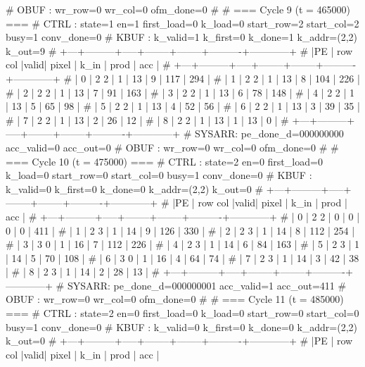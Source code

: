 # OBUF : wr_row=0 wr_col=0 ofm_done=0
# 
# === Cycle 9  (t = 465000) ===
# CTRL : state=1 en=1 first_load=0 k_load=0 start_row=2 start_col=2 busy=1 conv_done=0
# KBUF : k_valid=1 k_first=0 k_done=1 k_addr=(2,2) k_out=9
# +---+---------+-----+--------+--------+----------+------------+
# |PE | row col |valid| pixel  |  k_in  |   prod   |    acc     |
# +---+---------+-----+--------+--------+----------+------------+
# | 0 |   2   2 |  1  |     13 |      9 |      117 |        294 |
# | 1 |   2   2 |  1  |     13 |      8 |      104 |        226 |
# | 2 |   2   2 |  1  |     13 |      7 |       91 |        163 |
# | 3 |   2   2 |  1  |     13 |      6 |       78 |        148 |
# | 4 |   2   2 |  1  |     13 |      5 |       65 |         98 |
# | 5 |   2   2 |  1  |     13 |      4 |       52 |         56 |
# | 6 |   2   2 |  1  |     13 |      3 |       39 |         35 |
# | 7 |   2   2 |  1  |     13 |      2 |       26 |         12 |
# | 8 |   2   2 |  1  |     13 |      1 |       13 |          0 |
# +---+---------+-----+--------+--------+----------+------------+
# SYSARR: pe_done_d=000000000 acc_valid=0 acc_out=0
# OBUF : wr_row=0 wr_col=0 ofm_done=0
# 
# === Cycle 10  (t = 475000) ===
# CTRL : state=2 en=0 first_load=0 k_load=0 start_row=0 start_col=0 busy=1 conv_done=0
# KBUF : k_valid=0 k_first=0 k_done=0 k_addr=(2,2) k_out=0
# +---+---------+-----+--------+--------+----------+------------+
# |PE | row col |valid| pixel  |  k_in  |   prod   |    acc     |
# +---+---------+-----+--------+--------+----------+------------+
# | 0 |   2   2 |  0  |      0 |      0 |        0 |        411 |
# | 1 |   2   3 |  1  |     14 |      9 |      126 |        330 |
# | 2 |   2   3 |  1  |     14 |      8 |      112 |        254 |
# | 3 |   3   0 |  1  |     16 |      7 |      112 |        226 |
# | 4 |   2   3 |  1  |     14 |      6 |       84 |        163 |
# | 5 |   2   3 |  1  |     14 |      5 |       70 |        108 |
# | 6 |   3   0 |  1  |     16 |      4 |       64 |         74 |
# | 7 |   2   3 |  1  |     14 |      3 |       42 |         38 |
# | 8 |   2   3 |  1  |     14 |      2 |       28 |         13 |
# +---+---------+-----+--------+--------+----------+------------+
# SYSARR: pe_done_d=000000001 acc_valid=1 acc_out=411
# OBUF : wr_row=0 wr_col=0 ofm_done=0
# 
# === Cycle 11  (t = 485000) ===
# CTRL : state=2 en=0 first_load=0 k_load=0 start_row=0 start_col=0 busy=1 conv_done=0
# KBUF : k_valid=0 k_first=0 k_done=0 k_addr=(2,2) k_out=0
# +---+---------+-----+--------+--------+----------+------------+
# |PE | row col |valid| pixel  |  k_in  |   prod   |    acc     |
